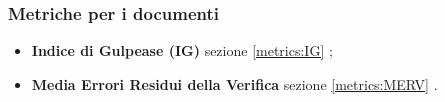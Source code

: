 %	
%		
%
%		


\subsubsection{Metriche per i documenti}
\begin{itemize}
	\item \textbf{Indice di Gulpease (IG)} sezione \ref{metrics:IG} ;
	\item \textbf{Media Errori Residui della Verifica} sezione \ref{metrics:MERV} .
\end{itemize}

